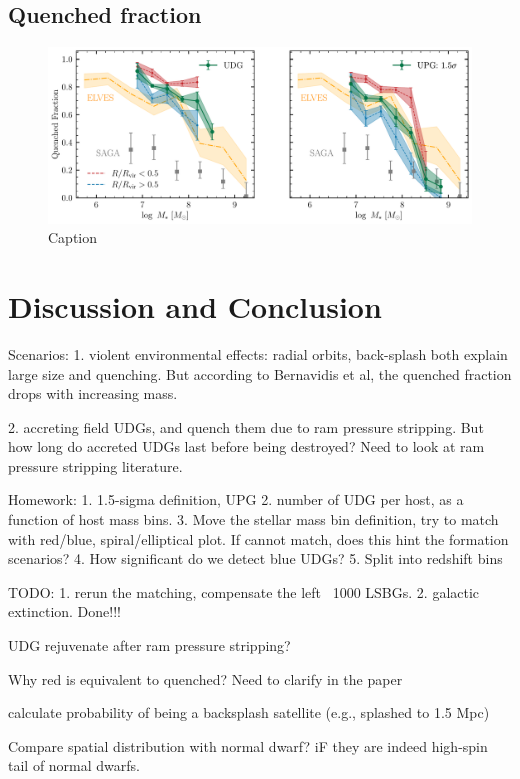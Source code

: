 \documentclass[twocolumn,astrosymb,twocolappendix]{aastex631}
\begin{document}
\begin{CJK*}{UTF8}{gbsn}
\subsection{Quenched fraction}

\citep{Baxter2021}
\begin{figure}
	\vbox{ 
		\centering
		\includegraphics[width=1\linewidth]{quenched_frac.pdf}
	}
    \caption{Caption}
    \label{fig:quenched_frac}
\end{figure}

\section{Discussion and Conclusion}
Scenarios:
1. violent environmental effects: radial orbits, back-splash both explain large size and quenching. But according to Bernavidis et al, the quenched fraction drops with increasing mass. 

2. accreting field UDGs, and quench them due to ram pressure stripping. But how long do accreted UDGs last before being destroyed? Need to look at ram pressure stripping literature.

Homework:
1. 1.5-sigma definition, UPG
2. number of UDG per host, as a function of host mass bins.
3. Move the stellar mass bin definition, try to match with red/blue, spiral/elliptical plot. If cannot match, does this hint the formation scenarios?
4. How significant do we detect blue UDGs? 
5. Split into redshift bins


TODO:
1. rerun the matching, compensate the left ~1000 LSBGs.
2. galactic extinction. Done!!!

UDG rejuvenate after ram pressure stripping?


Why red is equivalent to quenched? Need to clarify in the paper

calculate probability of being a backsplash satellite (e.g., splashed to 1.5 Mpc)

Compare spatial distribution with normal dwarf? iF they are indeed high-spin tail of normal dwarfs. 





\end{CJK*}
\end{document}
